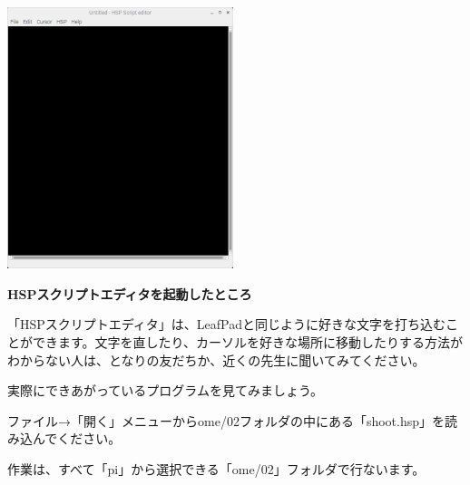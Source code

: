 \documentclass[a4paper,dvipdfmx]{jarticle}
\newcommand\textstyleqwerty[1]{#1}
\begin{document}
\bigskip



\begin{center}
\includegraphics[width=6.588cm,height=7.624cm]{text02-img/text02-img010.png}

\end{center}

\bigskip


\bigskip


\bigskip


\bigskip


\bigskip


\bigskip


\bigskip


\bigskip


\bigskip


\bigskip


\bigskip


\bigskip


\bigskip


\bigskip


\bigskip

\textstyleqwerty{\textbf{HSPスクリプトエディタを起動したところ}}


\bigskip

「HSPスクリプトエディタ」は、LeafPadと同じように好きな文字を打ち込むことができます。文字を直したり、カーソルを好きな場所に移動したりする方法がわからない人は、となりの友だちか、近くの先生に聞いてみてください。


\bigskip

実際にできあがっているプログラムを見てみましょう。

ファイル→「開く」メニューからome/02フォルダの中にある「shoot.hsp」を読み込んでください。

作業は、すべて「pi」から選択できる「ome/02」フォルダで行ないます。
\end{document}
